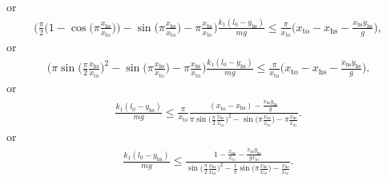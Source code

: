 \documentclass[journal,12pt,onecolumn]{IEEEtran}
\begin{document}
or
\begin{align}
	\Bigg(\frac{\pi}{2} \Big(1-\cos\Big(\pi \frac{x_{\text{hs}}}{x_{\text{to}}} \Big)\Big)  -  \sin \Big(\pi\frac{x_\text{hs}}{x_\text{to}} \Big) - \pi \frac{x_{\text{hs}}}{x_{\text{to}}} \Bigg) \frac{k_1(l_0-y_\text{hs})}{mg} \leq 
	\frac{\pi}{x_{\text{to}}} \Big( x_{\text{to}}-x_{\text{hs}} - \frac{\dot{x}_{\text{hs}}\dot{y}_{\text{hs}}}{g}\Big),
\end{align} 
or
\begin{align}
	\Bigg(\pi \sin\Big(\frac{\pi}{2} \frac{x_{\text{hs}}}{x_{\text{to}}} \Big)^2  -  \sin \Big(\pi\frac{x_\text{hs}}{x_\text{to}} \Big) - \pi \frac{x_{\text{hs}}}{x_{\text{to}}} \Bigg) \frac{k_1(l_0-y_\text{hs})}{mg} \leq 
	\frac{\pi}{x_{\text{to}}} \Big( x_{\text{to}}-x_{\text{hs}} - \frac{\dot{x}_{\text{hs}}\dot{y}_{\text{hs}}}{g}\Big).
\end{align} 
or
\begin{align}
\frac{k_1(l_0-y_\text{hs})}{mg} \leq 
	\frac{\pi}{x_{\text{to}}} \frac{(x_{\text{to}}-x_{\text{hs}}) - \frac{\dot{x}_{\text{hs}}\dot{y}_{\text{hs}}}{g}}{\pi \sin\Big(\frac{\pi}{2} \frac{x_{\text{hs}}}{x_{\text{to}}} \Big)^2  -  \sin \Big(\pi\frac{x_\text{hs}}{x_\text{to}} \Big) - \pi \frac{x_{\text{hs}}}{x_{\text{to}}}}.
\end{align} 
or
\begin{align}
	\frac{k_1(l_0-y_\text{hs})}{mg} \leq  \frac{1-\frac{x_{\text{hs}}}{x_{\text{to}}} - \frac{\dot{x}_{\text{hs}}\dot{y}_{\text{hs}}}{gx_{\text{to}}}}{\sin\Big(\frac{\pi}{2} \frac{x_{\text{hs}}}{x_{\text{to}}} \Big)^2  - \frac{1}{\pi}  \sin \Big(\pi\frac{x_\text{hs}}{x_\text{to}} \Big) - \frac{x_{\text{hs}}}{x_{\text{to}}}}.
\end{align} 
\end{document}
